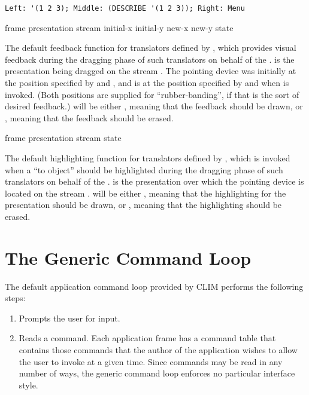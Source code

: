 {\begin{verbatim}
Left: '(1 2 3); Middle: (DESCRIBE '(1 2 3)); Right: Menu
\end{verbatim}


 {frame presentation stream
                                            initial-x initial-y new-x new-y state} 

The default feedback function for translators defined by
, which provides visual feedback during the
dragging phase of such translators on behalf of the  .
 is the presentation being dragged on the stream .
The pointing device was initially at the position specified by 
and , and is at the position specified by  and
 when  is invoked.  (Both positions
are supplied for ``rubber-banding'', if that is the sort of desired feedback.)
 will be either , meaning that the feedback should be
drawn, or , meaning that the feedback should be erased.

 {frame presentation stream state}

The default highlighting function for translators defined by
, which is invoked when a ``to object''
should be highlighted during the dragging phase of such translators on behalf of
the  .   is the presentation over which
the pointing device is located on the stream .   will be
either , meaning that the highlighting for the presentation
should be drawn, or , meaning that the highlighting should be
erased.


\section {The Generic Command Loop}

The default application command loop provided by CLIM performs the following
steps:

\begin{enumerate}
\item Prompts the user for input.

\item Reads a command.  Each application frame has a command table that contains
those commands that the author of the application wishes to allow the user to
invoke at a given time.  Since commands may be read in any number of ways, the
generic command loop enforces no particular interface style.


\end{enumerate}}
